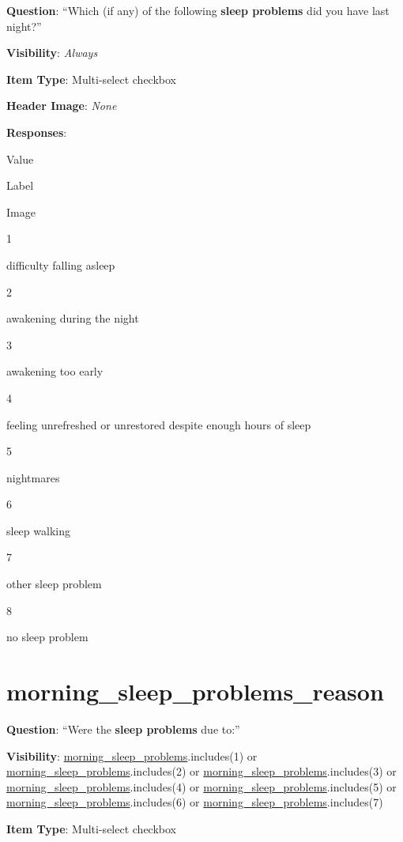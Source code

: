 \documentclass[]{book}
\begin{document}
\textbf{Question}: ``Which (if any) of the following \textbf{sleep problems} did you have last night?''

\textbf{Visibility}: \emph{Always}

\textbf{Item Type}: Multi-select checkbox

\textbf{Header Image}: \emph{None}

\textbf{Responses}:

Value

Label

Image

1

difficulty falling asleep

2

awakening during the night

3

awakening too early

4

feeling unrefreshed or unrestored despite enough hours of sleep

5

nightmares

6

sleep walking

7

other sleep problem

8

no sleep problem

\hypertarget{morning_sleep_problems_reason}{%
\section{morning\_sleep\_problems\_reason}\label{morning_sleep_problems_reason}}

\textbf{Question}: ``Were the \textbf{sleep problems} due to:''

\textbf{Visibility}: \protect\hyperlink{morning_sleep_problems}{morning\_sleep\_problems}.includes(1) or \protect\hyperlink{morning_sleep_problems}{morning\_sleep\_problems}.includes(2) or \protect\hyperlink{morning_sleep_problems}{morning\_sleep\_problems}.includes(3) or \protect\hyperlink{morning_sleep_problems}{morning\_sleep\_problems}.includes(4) or \protect\hyperlink{morning_sleep_problems}{morning\_sleep\_problems}.includes(5) or \protect\hyperlink{morning_sleep_problems}{morning\_sleep\_problems}.includes(6) or \protect\hyperlink{morning_sleep_problems}{morning\_sleep\_problems}.includes(7)

\textbf{Item Type}: Multi-select checkbox
\end{document}
